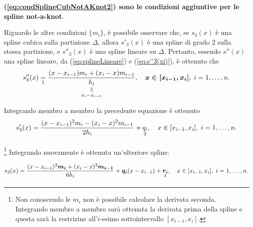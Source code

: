 \textbf{(\ref{eq:condSplineCubNotAKnot2}) sono le condizioni aggiuntive per le spline not-a-knot}.

Riguardo le altre condizioni $\{m_i\}$, è possibile osservare che, se $s_3(x)$ è una spline cubica sulla partizione $\Delta$, allora $s'_3(x)$ è una spline di grado 2 sulla stessa partizione, e $s''_3(x)$ è una spline lineare su $\Delta$. Pertanto, essendo $s''(x)$ una spline lineare, da (\ref{eq:splineLineare}) e (\ref{eq:s''3(xi)}), è ottenuto che
\begin{equation*}
    s''_3(x)\underset{\footnotemark}{=}\frac{(x-x_{i-1})m_i+(x_i-x)m_{i-1}}{\equalto{h_i}{x_i-x_{i-1}}},\quad\boldsymbol{x\in[x_{i-1}, x_i]},\; i=1,\hdots,n.
\end{equation*}

Integrando membro a membro la precedente equazione è ottenuto
\begin{equation}\label{eq:s'_3(x)}
    s'_3(x)=\frac{(x-x_{i-1})^2m_i-(x_i-x)^2m_{i-1}}{2h_i}+\underset{\footnotemark}{q_i},\quad x\in [x_{i-1}, x_i],\; i=1,\hdots,n.
\end{equation}

\noindent\footnote{Non conoscendo le $m_i$ non è possibile calcolare la derivata seconda. Integrando membro a membro sarà ottenuta la derivata prima della spline e questa sarà la restrizine all'$i$-esimo sottointervallo $[x_{i-1},x_i]$.}
Integrando nuovamente è ottenuta un'ulteriore spline:

\begin{equation}\label{eq:s3Ign}
    s_3(x)=\frac{(x-x_{i-1})^3\boldsymbol{m_i}+(x_i-x)^3\boldsymbol{m_{i-1}}}{6h_i}+\boldsymbol{q_i}(x-x_{i-1})+\underset{\footnotemark}{\boldsymbol{r_i}},\quad x\in[x_{i-1},x_i],\; i=1,\hdots,n.
\end{equation}

